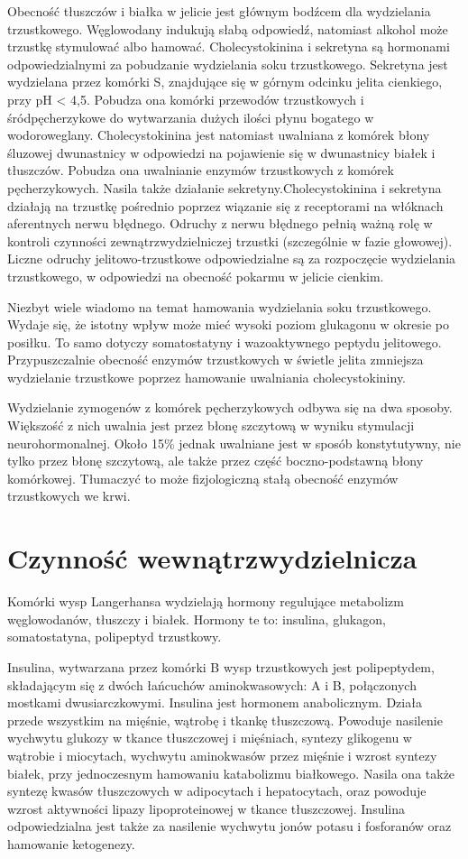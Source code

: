 \documentclass[a4paper, 12pt]{report}
\begin{document}
Obecność tłuszczów i białka w jelicie jest głównym bodźcem dla
wydzielania trzustkowego. Węglowodany indukują słabą odpowiedź,
natomiast alkohol może trzustkę stymulować albo hamować.
Cholecystokinina i sekretyna są hormonami odpowiedzialnymi za
pobudzanie wydzielania soku trzustkowego. Sekretyna jest wydzielana 
przez komórki S, znajdujące się w górnym odcinku jelita cienkiego, 
przy pH < 4,5. Pobudza ona komórki przewodów trzustkowych i
śródpęcherzykowe do wytwarzania dużych ilości płynu bogatego w wodoroweglany. 
Cholecystokinina jest natomiast uwalniana z komórek błony śluzowej
dwunastnicy w odpowiedzi na pojawienie się w dwunastnicy białek i
tłuszczów. Pobudza ona uwalnianie enzymów trzustkowych z komórek
pęcherzykowych. Nasila także działanie sekretyny.Cholecystokinina i
sekretyna działają na trzustkę pośrednio poprzez wiązanie się z
receptorami na włóknach aferentnych nerwu błędnego. Odruchy z nerwu
błędnego pełnią ważną rolę w kontroli czynności zewnątrzwydzielniczej
trzustki (szczególnie w fazie głowowej). Liczne odruchy
jelitowo-trzustkowe odpowiedzialne są za rozpoczęcie wydzielania
trzustkowego, w odpowiedzi na obecność pokarmu w jelicie cienkim.

Niezbyt wiele wiadomo na temat hamowania wydzielania soku
trzustkowego. Wydaje się, że istotny wpływ może mieć wysoki poziom
glukagonu w okresie po posiłku. To samo dotyczy somatostatyny i
wazoaktywnego peptydu jelitowego. Przypuszczalnie obecność enzymów
trzustkowych w świetle jelita zmniejsza wydzielanie trzustkowe poprzez
hamowanie uwalniania cholecystokininy.

Wydzielanie zymogenów z komórek pęcherzykowych odbywa się na dwa
sposoby. Większość z nich uwalnia jest przez błonę szczytową w wyniku
stymulacji neurohormonalnej. Około 15\% jednak uwalniane jest w sposób
konstytutywny, nie tylko przez błonę szczytową, ale także przez część
boczno-podstawną błony komórkowej. Tłumaczyć to może fizjologiczną
stałą obecność enzymów trzustkowych we krwi.

\section{Czynność wewnątrzwydzielnicza}

Komórki wysp Langerhansa wydzielają hormony regulujące metabolizm
węglowodanów, tłuszczy i białek. Hormony te to: insulina, glukagon,
somatostatyna, polipeptyd trzustkowy.

Insulina, wytwarzana przez komórki B wysp trzustkowych jest
polipeptydem, składającym się z dwóch łańcuchów aminokwasowych: A i B, 
połączonych mostkami dwusiarczkowymi. Insulina jest hormonem
anabolicznym. Działa przede wszystkim na mięśnie, wątrobę i tkankę tłuszczową.
Powoduje nasilenie wychwytu glukozy w tkance tłuszczowej i mięśniach,
syntezy glikogenu w wątrobie i miocytach, wychwytu aminokwasów przez
mięśnie i wzrost syntezy białek, przy jednoczesnym hamowaniu
katabolizmu białkowego. Nasila ona także syntezę kwasów tłuszczowych w
adipocytach i hepatocytach, oraz powoduje wzrost aktywności lipazy
lipoproteinowej w tkance tłuszczowej. Insulina odpowiedzialna jest
także za nasilenie wychwytu jonów potasu i fosforanów oraz hamowanie ketogenezy.
\end{document}

